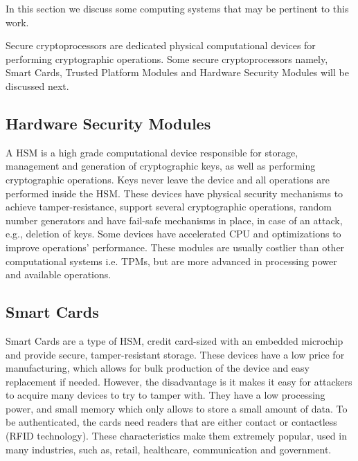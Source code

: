 In this section we discuss some computing systems that may be pertinent to this work. 

Secure cryptoprocessors are dedicated physical computational devices for performing cryptographic operations. Some secure cryptoprocessors namely, Smart Cards, Trusted Platform Modules and Hardware Security Modules will be discussed next.

\subsection{Hardware Security Modules}\label{chap:background:computing:hsm}

A \ac{HSM} is a high grade computational device responsible for storage, management and generation of cryptographic keys, as well as performing cryptographic operations. Keys never leave the device and all operations are performed inside the \ac{HSM}. These devices have physical security mechanisms to achieve tamper-resistance, support several cryptographic operations, random number generators and have fail-safe mechanisms in place, in case of an attack, e.g., deletion of keys. Some devices have accelerated \ac{CPU} and optimizations to improve operations' performance.
These modules are usually costlier than other computational systems i.e. \ac{TPM}s, but are more advanced in processing power and available operations.

\subsection*{Smart Cards}\label{chap:background:computing:smartcards}
Smart Cards are a type of \ac{HSM}, credit card-sized with an embedded microchip and provide secure, tamper-resistant storage. These devices have a low price for manufacturing, which allows for bulk production of the device and easy replacement if needed. However, the disadvantage is it makes it easy for attackers to acquire many devices to try to tamper with. They have a low processing power, and small memory which only allows to store a small amount of data. To be authenticated, the cards need readers that are either contact or contactless (RFID technology). These characteristics make them extremely popular, used in many industries, such as, retail, healthcare, communication and government.

